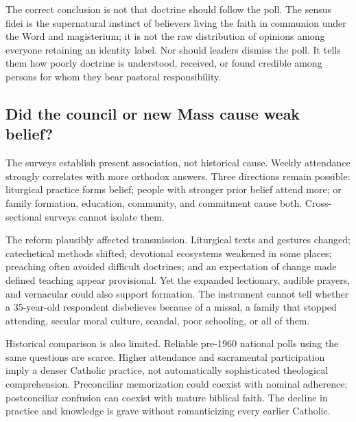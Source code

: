The correct conclusion is not that doctrine should follow the poll. The sensus fidei is the supernatural instinct of believers living the faith in communion under the Word and magisterium; it is not the raw distribution of opinions among everyone retaining an identity label. Nor should leaders dismiss the poll. It tells them how poorly doctrine is understood, received, or found credible among persons for whom they bear pastoral responsibility.

\subsection{Did the council or new Mass cause weak belief?}

The surveys establish present association, not historical cause. Weekly attendance strongly correlates with more orthodox answers. Three directions remain possible: liturgical practice forms belief; people with stronger prior belief attend more; or family formation, education, community, and commitment cause both. Cross-sectional surveys cannot isolate them.

The reform plausibly affected transmission. Liturgical texts and gestures changed; catechetical methods shifted; devotional ecosystems weakened in some places; preaching often avoided difficult doctrines; and an expectation of change made defined teaching appear provisional. Yet the expanded lectionary, audible prayers, and vernacular could also support formation. The instrument cannot tell whether a 35-year-old respondent disbelieves because of a missal, a family that stopped attending, secular moral culture, scandal, poor schooling, or all of them.

Historical comparison is also limited. Reliable pre-1960 national polls using the same questions are scarce. Higher attendance and sacramental participation imply a denser Catholic practice, not automatically sophisticated theological comprehension. Preconciliar memorization could coexist with nominal adherence; postconciliar confusion can coexist with mature biblical faith. The decline in practice and knowledge is grave without romanticizing every earlier Catholic.

